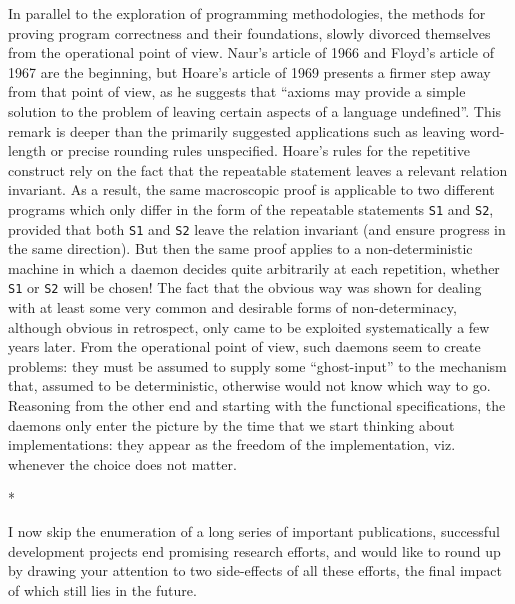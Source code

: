 \documentclass[12pt,letterpaper]{article}
\newcommand{\stardiv}{\medskip\centerline{*\qquad\raisebox{-1ex}{*}\qquad*}\medskip\noindent\ignorespaces}
\begin{document}
In parallel to the exploration of programming 
methodologies, the methods for proving program 
correctness and their foundations, slowly divorced 
themselves from the operational point of view. 
Naur's article of 1966 and Floyd's article of 1967 
are the beginning, but Hoare's article of 1969 
presents a firmer step away from that point of 
view, as he suggests that ``axioms may provide a 
simple solution to the problem of leaving certain 
aspects of a language undefined''. This remark is 
deeper than the primarily suggested applications 
such as leaving word-length or precise rounding 
rules unspecified. Hoare's rules for the repetitive 
construct rely on the fact that the repeatable 
statement leaves a relevant relation invariant. As 
a result, the same macroscopic proof is applicable 
to two different programs which only differ in the 
form of the repeatable statements \texttt{S1} and \texttt{S2},
provided that both \texttt{S1} and \texttt{S2} leave the relation
invariant (and ensure progress in the same 
direction). But then the same proof applies to 
a non-deterministic machine in which a daemon 
decides quite arbitrarily at each repetition, 
whether \texttt{S1} or \texttt{S2} will be chosen! The fact 
that the obvious way was shown for dealing with 
at least some very common and desirable forms of 
non-determinacy, although obvious in retrospect, 
only came to be exploited systematically a few 
years later. From the operational point of view, 
such daemons seem to create problems: they must be 
assumed to supply some ``ghost-input'' to the mechanism that, assumed to be deterministic, otherwise 
would not know which way to go. Reasoning from the 
other end and starting with the functional specifications, the daemons only enter the picture by 
the time that we start thinking about implementations: they appear as
the freedom of the implementation, viz. whenever the choice does not matter.

\stardiv

I now skip the enumeration of a long series 
of important publications, successful development 
projects end promising research efforts, and would 
like to round up by drawing your attention to two 
side-effects of all these efforts, the final impact of which still lies in the future. 
\end{document}
